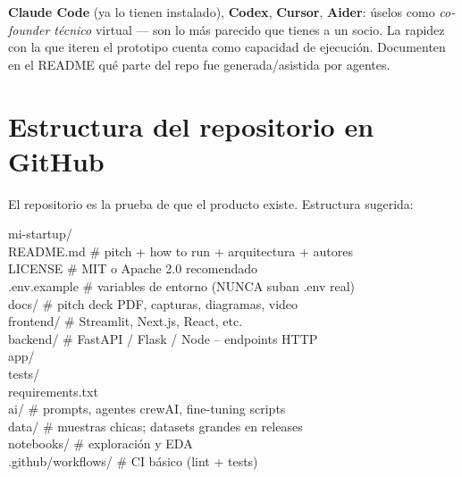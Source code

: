 \documentclass[11pt,a4paper]{article}
\begin{document}
\begin{tcolorbox}[tipbox={Agentes de c\'odigo para construir el producto}]
\textbf{Claude Code} (ya lo tienen instalado), \textbf{Codex}, \textbf{Cursor},
\textbf{Aider}: \'uselos como \emph{co-founder t\'ecnico} virtual --- son lo m\'as
parecido que tienes a un socio. La rapidez con la que iteren el prototipo cuenta
como capacidad de ejecuci\'on. Documenten en el README
qu\'e parte del repo fue generada/asistida por agentes.
\end{tcolorbox}

\section{Estructura del repositorio en GitHub}

El repositorio es la prueba de que el producto existe. Estructura sugerida:

\begin{tcolorbox}[enhanced, colback=clawLight, colframe=clawDark,
  boxrule=0.6pt, arc=2pt, fontupper=\ttfamily\small]
mi-startup/\\
\hspace*{1.2em}README.md          \# pitch + how to run + arquitectura + autores\\
\hspace*{1.2em}LICENSE            \# MIT o Apache 2.0 recomendado\\
\hspace*{1.2em}.env.example       \# variables de entorno (NUNCA suban .env real)\\
\hspace*{1.2em}docs/              \# pitch deck PDF, capturas, diagramas, video\\
\hspace*{1.2em}frontend/          \# Streamlit, Next.js, React, etc.\\
\hspace*{1.2em}backend/           \# FastAPI / Flask / Node -- endpoints HTTP\\
\hspace*{1.2em}\hspace*{1.2em}app/\\
\hspace*{1.2em}\hspace*{1.2em}tests/\\
\hspace*{1.2em}\hspace*{1.2em}requirements.txt\\
\hspace*{1.2em}ai/                \# prompts, agentes crewAI, fine-tuning scripts\\
\hspace*{1.2em}data/              \# muestras chicas; datasets grandes en releases\\
\hspace*{1.2em}notebooks/         \# exploraci\'on y EDA\\
\hspace*{1.2em}.github/workflows/ \# CI b\'asico (lint + tests)\\
\end{tcolorbox}
\end{document}
